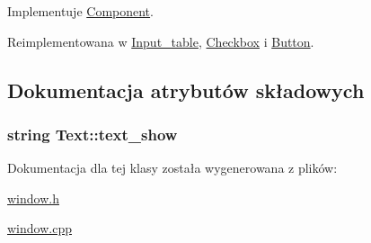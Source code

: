 Implementuje \hyperlink{classComponent_a247f6f0204b68a7efb9059cf709fe6ea}{Component}.



Reimplementowana w \hyperlink{classInput__table_ac48806d103ed557c4b9a4eac4a021cf3}{Input\+\_\+table}, \hyperlink{classCheckbox_afd75946a43da1dcba8e6f04f00df34ee}{Checkbox} i \hyperlink{classButton_a2fc33ec22217562b28ac6f02bda26c6e}{Button}.



\subsection{Dokumentacja atrybutów składowych}
\subsubsection[{\texorpdfstring{text\+\_\+show}{text_show}}]{\setlength{\rightskip}{0pt plus 5cm}string Text\+::text\+\_\+show\hspace{0.3cm}{\ttfamily [private]}}\hypertarget{classText_a3fd84b688c6971ba8626b910f0bc2ce3}{}\label{classText_a3fd84b688c6971ba8626b910f0bc2ce3}


Dokumentacja dla tej klasy została wygenerowana z plików\+:\begin{DoxyCompactItemize}
\item 
\hyperlink{window_8h}{window.\+h}\item 
\hyperlink{window_8cpp}{window.\+cpp}\end{DoxyCompactItemize}
